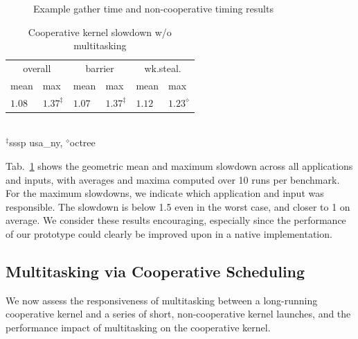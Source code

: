 \documentclass[parskip=half,sigconf,review, anonymous=true, acmcopyrightmode=none]{acmart}
\newcommand{\mytab}{Tab.~}
\begin{document}
\begin{figure}
\caption{Example gather time and non-cooperative timing results}\label{fig:fine-grained-timing}
\vspace{-3mm}
\end{figure}


\begin{table}
\normalsize
\centering
\begin{tabular}{ l l | l l | l l }
\multicolumn{2}{c|}{overall} & \multicolumn{2}{c|}{barrier} & \multicolumn{2}{c}{wk.steal.} \\
mean & max & mean & max & mean & max \\
\hline
$1.08$ & $1.37^{\ddagger}$ & $1.07$ & $1.37^{\ddagger}$ & $1.12$ & $1.23^{\diamond}$ \\
\end{tabular}\\
{\small
 $^{\ddagger}$sssp usa\_ny, $^{\diamond}$octree
}
\caption{Cooperative kernel slowdown w/o multitasking}
\label{tab:overhead}
\vspace{-8mm}
\end{table}



\mytab\ref{tab:overhead} shows the geometric mean and
maximum slowdown across all applications and inputs, with averages and
maxima computed over 10 runs per benchmark. For the maximum slowdowns,
we indicate which application and input was responsible. The slowdown is
below 1.5 even in the worst case, and closer to 1 on average. We consider
these results encouraging, especially since the performance of our
prototype could clearly be improved upon in a native implementation.


\subsection{Multitasking via Cooperative Scheduling}\label{sec:responsiveness}

We now assess the responsiveness of multitasking between a
long-running cooperative kernel and a series of short, non-cooperative
kernel launches, and the performance impact of multitasking on the
cooperative kernel.

\end{document}
